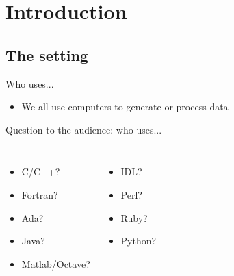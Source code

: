 \section{Introduction}

\subsection{The setting}

\begin{frame}{Who uses...}

\begin{itemize}
    \item We all use computers to generate or process data
\end{itemize}

Question to the audience: who uses...

\begin{columns}[t]


\begin{itemize}
    \item C/C++?
    \item Fortran?
    \item Ada?
    \item Java?
    \item Matlab/Octave?
\end{itemize}


\begin{itemize}
    \item IDL?
    \item Perl?
    \item Ruby?
    \item \alert{Python}?
\end{itemize}

\end{columns}

\end{frame}


